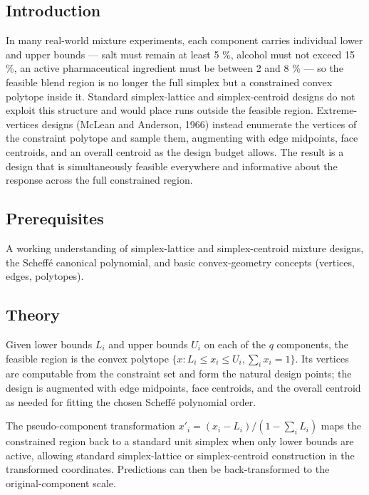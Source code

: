 \documentclass[
]{article}
\author{}
\date{\vspace{-2.5em}}
\begin{document}
\subsection{Introduction}\label{introduction}

In many real-world mixture experiments, each component carries
individual lower and upper bounds --- salt must remain at least 5 \%,
alcohol must not exceed 15 \%, an active pharmaceutical ingredient must
be between 2 and 8 \% --- so the feasible blend region is no longer the
full simplex but a constrained convex polytope inside it. Standard
simplex-lattice and simplex-centroid designs do not exploit this
structure and would place runs outside the feasible region.
Extreme-vertices designs (McLean and Anderson, 1966) instead enumerate
the vertices of the constraint polytope and sample them, augmenting with
edge midpoints, face centroids, and an overall centroid as the design
budget allows. The result is a design that is simultaneously feasible
everywhere and informative about the response across the full
constrained region.

\subsection{Prerequisites}\label{prerequisites}

A working understanding of simplex-lattice and simplex-centroid mixture
designs, the Scheffé canonical polynomial, and basic convex-geometry
concepts (vertices, edges, polytopes).

\subsection{Theory}\label{theory}

Given lower bounds \(L_i\) and upper bounds \(U_i\) on each of the \(q\)
components, the feasible region is the convex polytope
\(\{x : L_i \leq x_i \leq U_i, \sum_i x_i = 1\}\). Its vertices are
computable from the constraint set and form the natural design points;
the design is augmented with edge midpoints, face centroids, and the
overall centroid as needed for fitting the chosen Scheffé polynomial
order.

The pseudo-component transformation
\(x'_i = (x_i - L_i)/(1 - \sum_i L_i)\) maps the constrained region back
to a standard unit simplex when only lower bounds are active, allowing
standard simplex-lattice or simplex-centroid construction in the
transformed coordinates. Predictions can then be back-transformed to the
original-component scale.
\end{document}
